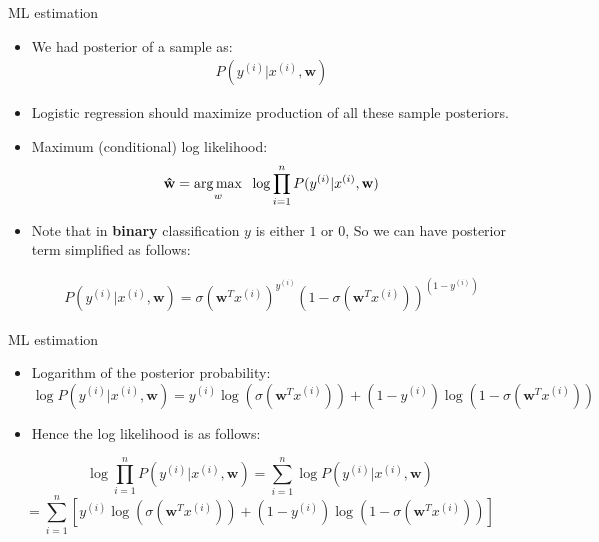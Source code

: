 \documentclass[serif, aspectratio=169]{beamer}
\begin{document}
\begin{frame}{ML estimation}
    \begin{itemize}
        \item We had posterior of a sample as:
        \begin{align*}
            P(y^{(i)}|x^{(i)},\mathbf{w})
        \end{align*}
        \item Logistic regression should maximize production of all these sample posteriors.
        
        \item Maximum (conditional) log likelihood:
        \begin{align*}
             \mathbf{\hat{w}} = \underset{w}{\arg\max} \hspace{0.2cm} \log \prod_{i=1}^{n} P(y^{(i)}|x^{(i)},\mathbf{w})
        \end{align*}
        \item Note that in \textbf{binary} classification $y$ is either $1$ or $0$, So we can have posterior term simplified as follows:
        
        \begin{align*}
            P(y^{(i)}|x^{(i)},\mathbf{w})=\sigma (\mathbf{w}^Tx^{(i)})^{y^{(i)}} (1 - \sigma (\mathbf{w}^T x^{(i)}))^{(1 - y^{(i)})}
        \end{align*}
    \end{itemize}
\end{frame}
\begin{frame}{ML estimation}
    \begin{itemize}
        \item Logarithm of the posterior probability:
            \[
            \log P(y^{(i)}|x^{(i)}, \mathbf{w})=
            y^{(i)}\log (\sigma (\mathbf{w} ^T x^{(i)})) + 
            (1-y^{(i)})\log (1 - \sigma (\mathbf{w}^T x^{(i)}))
            \]
        \item Hence the log likelihood is as follows:
    \end{itemize}
    \[
    \log \prod _{i=1}^{n} P(y^{(i)}|x^{(i)}, \mathbf{w}) = \sum  _{i=1}^{n} \log P(y^{(i)}|x^{(i)}, \mathbf{w})
    \]
    \[
    = \sum_{i=1}^{n}[y^{(i)}\log ( \sigma (\mathbf{w} ^T x^{(i)})) + 
    (1-y^{(i)})\log (1 - \sigma (\mathbf{w} ^ T x^{(i)}))]
    \]
\end{frame}


\end{document}
